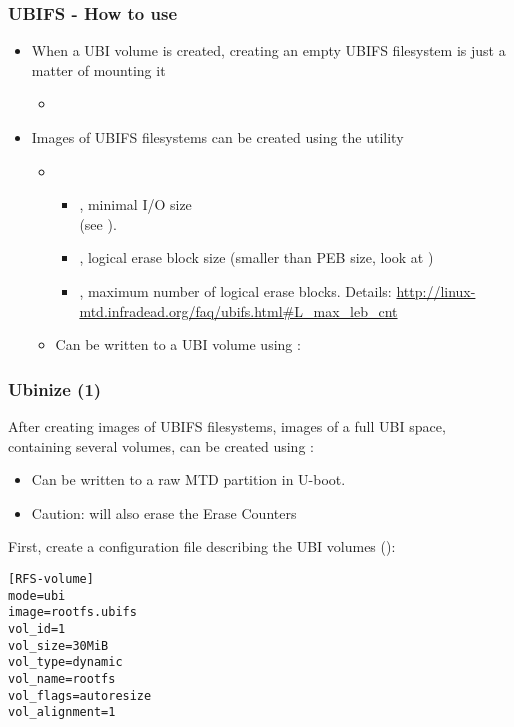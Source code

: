 \begin{frame}
  \frametitle{UBIFS - How to use}
  \begin{itemize}
  \item When a UBI volume is created, creating an empty UBIFS
    filesystem is just a matter of mounting it
    \begin{itemize}
    \item {}
    \end{itemize}
  \item Images of UBIFS filesystems can be created using the
     utility
    \begin{itemize}
    \item {}
      \begin{itemize}
      \item {}, minimal I/O size\\
                 (see ).
      \item {}, logical erase block size (smaller than
                 PEB size, look at )
      \item {}, maximum number of logical erase
        blocks. Details:
        {\tiny\url{http://linux-mtd.infradead.org/faq/ubifs.html\#L_max_leb_cnt}}
      \end{itemize}
    \item Can be written to a UBI volume using : \\
    \end{itemize}
  \end{itemize}
\end{frame}

\begin{frame}[fragile]
  \frametitle{Ubinize (1)}
  After creating images of UBIFS filesystems, images of a full UBI space,
  containing several volumes, can be created using :
  \begin{itemize}
  \item Can be written to a raw MTD partition in U-boot.
  \item Caution:  will also erase the Erase Counters
  \end{itemize}
  First, create a configuration file describing the UBI volumes ():
\small
\begin{verbatim}
[RFS-volume]
mode=ubi
image=rootfs.ubifs
vol_id=1
vol_size=30MiB
vol_type=dynamic
vol_name=rootfs
vol_flags=autoresize
vol_alignment=1
\end{verbatim}
\end{frame}

